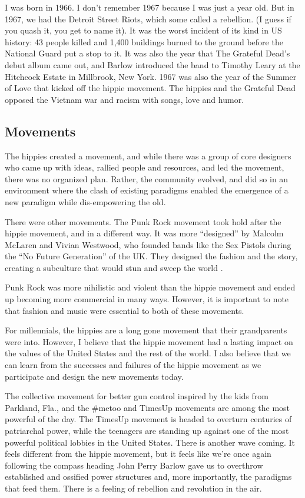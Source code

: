 I was born in 1966. I don't remember 1967 because I was just a year old. But in 1967, we had the Detroit Street Riots, which some called a rebellion. (I guess if you quash it, you get to name it). It was the worst incident of its kind in US history: 43 people  killed and 1,400 buildings burned to the ground before the National Guard put a stop to it. It was also the year that The Grateful Dead's debut album came out, and Barlow introduced the band to Timothy Leary at the Hitchcock Estate in Millbrook, New York. 1967 was also the year of the Summer of Love that kicked off the hippie movement. The hippies and the Grateful Dead opposed the Vietnam war and racism  with songs, love and humor.

\subsection{Movements}

The hippies created a movement, and while there was a group of core designers who came up with ideas, rallied people and resources, and led the movement, there was no organized plan. Rather, the community evolved, and did so in an environment where the clash of existing paradigms enabled the emergence of a new paradigm while dis-empowering the old.

There were other movements. The Punk Rock movement took hold after the hippie movement, and in a different way. It was more ``designed'' by Malcolm McLaren and Vivian Westwood, who founded bands like the Sex Pistols during the ``No Future Generation'' of the UK. They designed the fashion and the story, creating a subculture that would stun and sweep the world \cite{marcus2009lipstick}.

Punk Rock was more nihilistic and violent than the hippie movement and ended up becoming more commercial in many ways. However, it is important to note that fashion and music were essential to both of these movements.

For millennials, the hippies are a long gone movement that their grandparents were into. However, I believe that the hippie movement had a lasting impact on the values of the United States and the rest of the world. I also believe that we can learn from the successes and failures of the hippie movement as we participate and design the new movements today.
 
The collective movement for better gun control inspired by the kids from Parkland, Fla., and the \#metoo and TimesUp movements are among the most powerful of the day. The TimesUp movement is headed to overturn centuries of patriarchal power, while the teenagers are standing up against one of the most powerful political lobbies in the United States. There is another wave coming. It feels different from the hippie movement, but it feels like we're once again following the compass heading John Perry Barlow gave us to overthrow established and ossified power structures and, more importantly, the paradigms that feed them. There is a feeling of rebellion and revolution in the air. 

